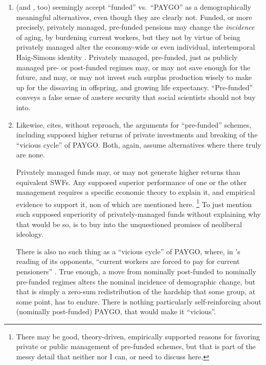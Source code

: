 \begin{enumerate}
	\item \citeauthor{Cerami2009a} (and \citealt{Bastian1998}, too) seemingly accept ``funded'' vs.\ ``PAYGO'' as a demographically meaningful alternatives, even though they are clearly not.
	Funded, or more precisely, privately managed, pre-funded pensions may change the \emph{incidence} of aging, by burdening current workers, but they not by virtue of being privately managed alter the economy-wide or even individual, intertemporal Haig-Simons identity \citep[for a detailed model, see][170]{Borsch-Supan2003}.
	Privately managed, pre-funded, just as publicly managed pre- or post-funded regimes may, or may not save enough for the future, and may, or may not invest such surplus production wisely to make up for the dissaving in offspring, and growing life expectancy.
	``Pre-funded'' conveys a false sense of austere security that social scientists should not buy into.

	\item Likewise, \citeauthor{Cerami2009a} cites, without reproach, the arguments for ``pre-funded'' schemes, including supposed higher returns of private investments and breaking of the ``vicious cycle'' of PAYGO.
	Both, again, assume alternatives where there truly are none.

	Privately managed funds may, or may not generate higher returns than equivalent \glspl{SWF}.
	Any supposed superior performance of one or the other management requires a specific economic theory to explain it, and empirical evidence to support it, non of which are mentioned here.
	\footnote{
		There may be good, theory-driven, empirically supported reasons for favoring private or public management of pre-funded schemes, but that is part of the messy detail that neither \citeauthor{Cerami2009a} nor I can, or need to discuss here.
	}
	To just mention such supposed superiority of privately-managed funds without explaining why that would be so, is to buy into the unquestioned promises of neoliberal ideology.

	There is also no such thing as a ``vicious cycle'' of PAYGO, where, in \citeauthor{Cerami2009a}'s reading of its opponents, ``current workers are forced to pay for current pensioners'' \citeyearpar[339]{Cerami2009a}.
	True enough, a move from nominally post-funded to nominally pre-funded regimes alters the nominal incidence of demographic change, but that is simply a zero-sum redistribution of the hardship that some group, at some point, has to endure.
	There is nothing particularly self-reinforcing about (nominally post-funded) PAYGO, that would make it ``vicious''.


\end{enumerate}
